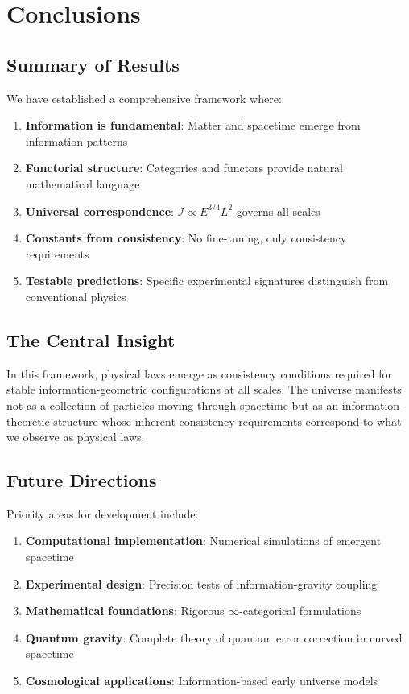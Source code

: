 \documentclass[11pt,a4paper]{article}
\theoremstyle{definition}
\begin{document}
\section{Conclusions}

\subsection{Summary of Results}

We have established a comprehensive framework where:

\begin{enumerate}
\item \textbf{Information is fundamental}: Matter and spacetime emerge from information patterns
\item \textbf{Functorial structure}: Categories and functors provide natural mathematical language
\item \textbf{Universal correspondence}: $\mathcal{I} \propto E^{3/4}L^2$ governs all scales
\item \textbf{Constants from consistency}: No fine-tuning, only consistency requirements
\item \textbf{Testable predictions}: Specific experimental signatures distinguish from conventional physics
\end{enumerate}

\subsection{The Central Insight}

In this framework, physical laws emerge as consistency conditions required for stable information-geometric configurations at all scales. The universe manifests not as a collection of particles moving through spacetime but as an information-theoretic structure whose inherent consistency requirements correspond to what we observe as physical laws.

\subsection{Future Directions}

Priority areas for development include:

\begin{enumerate}
\item \textbf{Computational implementation}: Numerical simulations of emergent spacetime
\item \textbf{Experimental design}: Precision tests of information-gravity coupling
\item \textbf{Mathematical foundations}: Rigorous $\infty$-categorical formulations
\item \textbf{Quantum gravity}: Complete theory of quantum error correction in curved spacetime
\item \textbf{Cosmological applications}: Information-based early universe models
\end{enumerate}
\end{document}
